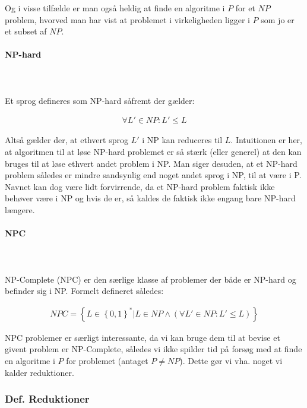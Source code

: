 Og i visse tilfælde er man også heldig at finde en algoritme i $P$ for et $NP$ problem, hvorved man har vist at problemet i virkeligheden ligger i $P$ som jo er et subset af $NP$.

\paragraph{NP-hard}
~\\
~\\
Et sprog defineres som NP-hard såfremt der gælder:

\begin{align*}
 \forall L' \in NP: L' \leq L
\end{align*}

Altså gælder der, at ethvert sprog $L'$ i NP kan reduceres til $L$. Intuitionen er her, at algoritmen til at løse NP-hard problemet er så stærk (eller generel) at den kan bruges til at løse ethvert andet problem i NP. Man siger desuden, at et NP-hard problem således er mindre sandsynlig end noget andet sprog i NP, til at være i P.\\

Navnet kan dog være lidt forvirrende, da et NP-hard problem faktisk ikke behøver være i NP og hvis de er, så kaldes de faktisk ikke engang bare NP-hard længere.

\paragraph{NPC}
~\\
~\\
NP-Complete (NPC) er den særlige klasse af problemer der både er NP-hard og befinder sig i NP. Formelt defineret således: 

\begin{align*}
 NPC = \left\lbrace L \in \left\lbrace 0,1 \right\rbrace^* | L \in NP \wedge (\forall L' \in NP: L' \leq L) \right\rbrace
\end{align*}

NPC problemer er særligt interessante, da vi kan bruge dem til at bevise et givent problem er NP-Complete, således vi ikke spilder tid på forsøg med at finde en algoritme i $P$ for problemet (antaget $P\neq NP$). Dette gør vi vha. noget vi kalder reduktioner.

\subsubsection{Def. Reduktioner}

